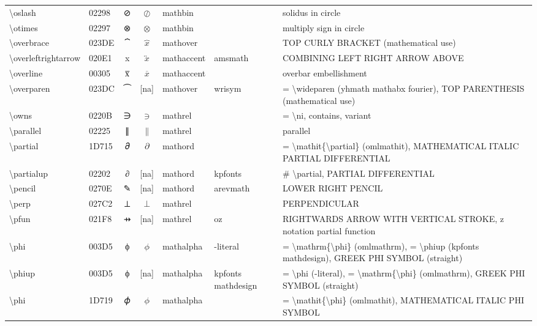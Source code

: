 \documentclass[a4paper,landscape]{article}
\begin{document}
\begin{longtable}{llcclll}
\textbackslash{}oslash & 02298 & ⊘ & $\oslash$ & mathbin &  & solidus in circle \\
\textbackslash{}otimes & 02297 & ⊗ & $\otimes$ & mathbin &  & multiply sign in circle \\
\textbackslash{}overbrace & 023DE & ⏞ & $\overbrace{x}$ & mathover &  & TOP CURLY BRACKET (mathematical use) \\
\textbackslash{}overleftrightarrow & 020E1 & x⃡ & $\overleftrightarrow{x}$ & mathaccent & amsmath & COMBINING LEFT RIGHT ARROW ABOVE \\
\textbackslash{}overline & 00305 & x̅ & $\overline{x}$ & mathaccent &  & overbar embellishment \\
\textbackslash{}overparen & 023DC & ⏜ & [na] & mathover & wrisym & = \textbackslash{}wideparen (yhmath mathabx fourier), TOP PARENTHESIS (mathematical use) \\
\textbackslash{}owns & 0220B & ∋ & $\owns$ & mathrel &  & = \textbackslash{}ni,  contains,  variant \\
\textbackslash{}parallel & 02225 & ∥ & $\parallel$ & mathrel &  & parallel \\
\textbackslash{}partial & 1D715 & 𝜕 & $\partial$ & mathord &  & = \textbackslash{}mathit\{\textbackslash{}partial\} (omlmathit), MATHEMATICAL ITALIC PARTIAL DIFFERENTIAL \\
\textbackslash{}partialup & 02202 & ∂ & [na] & mathord & kpfonts & \# \textbackslash{}partial, PARTIAL DIFFERENTIAL \\
\textbackslash{}pencil & 0270E & ✎ & [na] & mathord & arevmath & LOWER RIGHT PENCIL \\
\textbackslash{}perp & 027C2 & ⟂ & $\perp$ & mathrel &  & PERPENDICULAR \\
\textbackslash{}pfun & 021F8 & ⇸ & [na] & mathrel & oz & RIGHTWARDS ARROW WITH VERTICAL STROKE, z notation partial function \\
\textbackslash{}phi & 003D5 & ϕ & $\phi$ & mathalpha & -literal & = \textbackslash{}mathrm\{\textbackslash{}phi\} (omlmathrm), = \textbackslash{}phiup (kpfonts mathdesign), GREEK PHI SYMBOL (straight) \\
\textbackslash{}phiup & 003D5 & ϕ & [na] & mathalpha & kpfonts mathdesign & = \textbackslash{}phi (-literal), = \textbackslash{}mathrm\{\textbackslash{}phi\} (omlmathrm),  GREEK PHI SYMBOL (straight) \\
\textbackslash{}phi & 1D719 & 𝜙 & $\phi$ & mathalpha &  & = \textbackslash{}mathit\{\textbackslash{}phi\} (omlmathit), MATHEMATICAL ITALIC PHI SYMBOL \\

\end{longtable}
\end{document}

